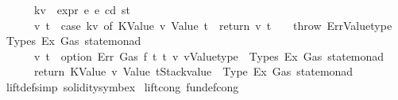 \begin{isabellebody}
\ \ \ \ \ \ kv{}\ {\isasymleftarrow}\ expr\ e{}\ e\ cd\ st{\isacharsemicolon}{\kern0pt}\isanewline
\ \ \ \ \ \ {\isacharparenleft}{\kern0pt}v{}{\isacharcomma}{\kern0pt}\ t{}{\isacharparenright}{\kern0pt}\ {\isasymleftarrow}\ case\ kv{}\ of\ {\isacharparenleft}{\kern0pt}KValue\ v{}{\isacharcomma}{\kern0pt}\ Value\ t{}{\isacharparenright}{\kern0pt}\ {\isasymRightarrow}\ return\ {\isacharparenleft}{\kern0pt}v{}{\isacharcomma}{\kern0pt}\ t{}{\isacharparenright}{\kern0pt}\ {\isacharbar}{\kern0pt}\ {\isacharunderscore}{\kern0pt}\ {\isasymRightarrow}\ {\isacharparenleft}{\kern0pt}throw\ Err{\isacharcolon}{\kern0pt}{\isacharcolon}{\kern0pt}{\isacharparenleft}{\kern0pt}Valuetype\ {\isacharasterisk}{\kern0pt}\ Types{\isacharcomma}{\kern0pt}\ Ex{\isacharcomma}{\kern0pt}\ Gas{\isacharparenright}{\kern0pt}\ state{\isacharunderscore}{\kern0pt}monad{\isacharparenright}{\kern0pt}{\isacharsemicolon}{\kern0pt}\isanewline
\ \ \ \ \ \ {\isacharparenleft}{\kern0pt}v{\isacharcomma}{\kern0pt}\ t{\isacharparenright}{\kern0pt}\ {\isasymleftarrow}\ {\isacharparenleft}{\kern0pt}option\ Err\ {\isacharparenleft}{\kern0pt}{\isasymlambda}{\isacharunderscore}{\kern0pt}{\isacharcolon}{\kern0pt}{\isacharcolon}{\kern0pt}Gas{\isachardot}{\kern0pt}\ f\ t{}\ t{}\ v{}\ v{}{\isacharparenright}{\kern0pt}{\isacharparenright}{\kern0pt}{\isacharcolon}{\kern0pt}{\isacharcolon}{\kern0pt}{\isacharparenleft}{\kern0pt}Valuetype\ {\isacharasterisk}{\kern0pt}\ Types{\isacharcomma}{\kern0pt}\ Ex{\isacharcomma}{\kern0pt}\ Gas{\isacharparenright}{\kern0pt}\ state{\isacharunderscore}{\kern0pt}monad{\isacharsemicolon}{\kern0pt}\isanewline
\ \ \ \ \ \ return\ {\isacharparenleft}{\kern0pt}KValue\ v{\isacharcomma}{\kern0pt}\ Value\ t{\isacharparenright}{\kern0pt}{\isacharcolon}{\kern0pt}{\isacharcolon}{\kern0pt}{\isacharparenleft}{\kern0pt}Stackvalue\ {\isacharasterisk}{\kern0pt}\ Type{\isacharcomma}{\kern0pt}\ Ex{\isacharcomma}{\kern0pt}\ Gas{\isacharparenright}{\kern0pt}\ state{\isacharunderscore}{\kern0pt}monad\isanewline
\ \ \ \ {\isacharbraceright}{\kern0pt}{\isacharparenright}{\kern0pt}{\isachardoublequoteclose}\isanewline
{}\isamarkupfalse%
\ lift{\isacharunderscore}{\kern0pt}def{\isacharbrackleft}{\kern0pt}simp{\isacharcomma}{\kern0pt}\ solidity{\isacharunderscore}{\kern0pt}symbex{\isacharbrackright}{\kern0pt}\isanewline
\isanewline
{}\isamarkupfalse%
\ lift{\isacharunderscore}{\kern0pt}cong\ {\isacharbrackleft}{\kern0pt}fundef{\isacharunderscore}{\kern0pt}cong{\isacharbrackright}{\kern0pt}{\isacharcolon}{\kern0pt}\isanewline

\end{isabellebody}
